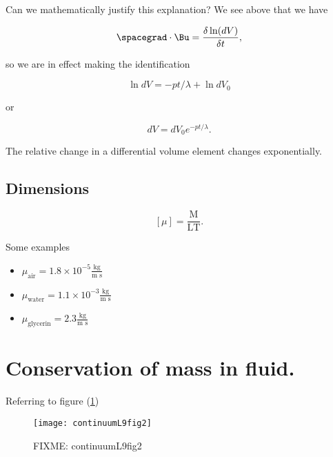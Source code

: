 Can we mathematically justify this explanation?  We see above that we have

\begin{equation}\label{eqn:continuumL9:n}
\spacegrad \cdot \Bu = \frac{\delta \ln(dV)}{\delta t},
\end{equation}

so we are in effect making the identification

\begin{equation}\label{eqn:continuumL9:n}
\ln dV = -p t /\lambda + \ln dV_0
\end{equation}

or

\begin{equation}\label{eqn:continuumL9:n}
dV = dV_0 e^{-p t/\lambda}.
\end{equation}

The relative change in a differential volume element changes exponentially.

\subsection{Dimensions}

\begin{equation}\label{eqn:continuumL9:290}
[\mu] = \frac{\text{M}}{\text{L}\text{T}}.
\end{equation}

Some examples

\begin{itemize}
\item $\mu_{\text{air}} = 1.8 \times 10^{-5} \frac{\text{kg}}{\text{m s}}$
\item $\mu_{\text{water}} = 1.1 \times 10^{-3} \frac{\text{kg}}{\text{m s}}$
\item $\mu_{\text{glycerin}} = 2.3 \frac{\text{kg}}{\text{m s}}$
\end{itemize}

\section{Conservation of mass in fluid.}

Referring to figure (\ref{fig:continuumL9:continuumL9fig2})
\begin{figure}[htp]
   \centering
   \texttt{[image: continuumL9fig2]}
   \caption{FIXME: continuumL9fig2}\label{fig:continuumL9:continuumL9fig2}
\end{figure}


